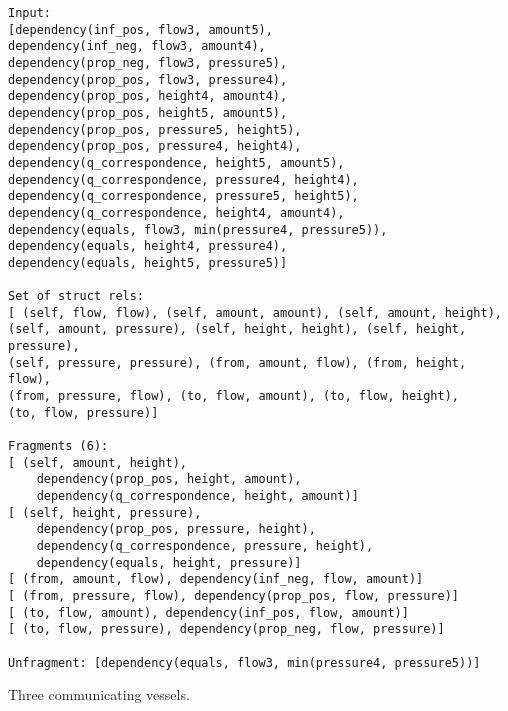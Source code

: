 \documentclass{article}
\begin{document}
\begin{verbatim}
Input: 
[dependency(inf_pos, flow3, amount5), 
dependency(inf_neg, flow3, amount4), 
dependency(prop_neg, flow3, pressure5), 
dependency(prop_pos, flow3, pressure4), 
dependency(prop_pos, height4, amount4), 
dependency(prop_pos, height5, amount5), 
dependency(prop_pos, pressure5, height5), 
dependency(prop_pos, pressure4, height4), 
dependency(q_correspondence, height5, amount5), 
dependency(q_correspondence, pressure4, height4), 
dependency(q_correspondence, pressure5, height5), 
dependency(q_correspondence, height4, amount4), 
dependency(equals, flow3, min(pressure4, pressure5)), 
dependency(equals, height4, pressure4), 
dependency(equals, height5, pressure5)]

Set of struct rels: 
[ (self, flow, flow), (self, amount, amount), (self, amount, height), 
(self, amount, pressure), (self, height, height), (self, height, pressure),
(self, pressure, pressure), (from, amount, flow), (from, height, flow), 
(from, pressure, flow), (to, flow, amount), (to, flow, height), 
(to, flow, pressure)]

Fragments (6):
[ (self, amount, height), 
	dependency(prop_pos, height, amount), 
	dependency(q_correspondence, height, amount)]
[ (self, height, pressure), 
	dependency(prop_pos, pressure, height), 
	dependency(q_correspondence, pressure, height), 
	dependency(equals, height, pressure)]
[ (from, amount, flow), dependency(inf_neg, flow, amount)]
[ (from, pressure, flow), dependency(prop_pos, flow, pressure)]
[ (to, flow, amount), dependency(inf_pos, flow, amount)]
[ (to, flow, pressure), dependency(prop_neg, flow, pressure)]

Unfragment: [dependency(equals, flow3, min(pressure4, pressure5))]
\end{verbatim}

Three communicating vessels.
\end{document}
